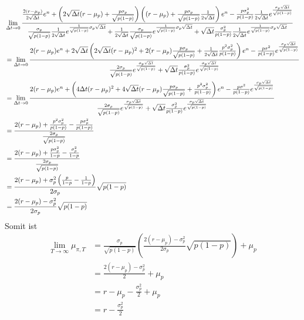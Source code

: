 \documentclass[11pt]{report} %
\begin{document}
\begin{align*}
    &\lim_{\Delta t \to 0}\frac{\frac{2(r-\mu_p)}{2\sqrt{\Delta t}}e^{n}+\left(2\sqrt{\Delta t}(r-\mu_p)+\frac{p\sigma_p}{\sqrt{p(1-p)}}\right)\left((r-\mu_p)+\frac{p\sigma_p}{\sqrt{p(1-p)}}\frac{1}{2\sqrt{\Delta t}}\right)e^{n}\linebreak-\frac{p\sigma_p^2}{p(1-p)}\frac{1}{2\sqrt{\Delta t}}e^{\frac{\sigma_p\sqrt{\Delta t}}{\sqrt{p(1-p)}}}}{\frac{\sigma_p}{\sqrt{p(1-p)}}\frac{1}{2\sqrt{\Delta t}}e^{\frac{1}{\sqrt{p(1-p)}}\sigma_p\sqrt{\Delta t}}+\frac{1}{2\sqrt{\Delta t}}\frac{\sigma_p}{\sqrt{p(1-p)}}e^{\frac{1}{\sqrt{p(1-p)}}\sigma_p\sqrt{\Delta t}}+\sqrt{\Delta t}\frac{\sigma_p^2}{p(1-p)}\frac{1}{2\sqrt{\Delta t}}e^{\frac{1}{\sqrt{p(1-p)}}\sigma_p\sqrt{\Delta t}}}\\
    &=\lim_{\Delta t \to 0}\frac{2(r-\mu_p)e^n+2\sqrt{\Delta t}\left( 2\sqrt{\Delta t}(r-\mu_p)^2+2(r-\mu_p)\frac{p\sigma_p}{\sqrt{p(1-p)}}+\frac{1}{2\sqrt{\Delta t}}\frac{p^2\sigma_p^2}{p(1-p)} \right)e^{n}-\frac{p\sigma^2}{p(1-p)}e^{\frac{\sigma_p\sqrt{\Delta t}}{\sqrt{p(1-p)}}}}{\frac{2\sigma_p}{\sqrt{p(1-p)}}e^{\frac{\sigma_p\sqrt{\Delta t}}{\sqrt{p(1-p)}}}+\sqrt{\Delta t}\frac{\sigma_p^2}{p(1-p)}e^{\frac{\sigma_p\sqrt{\Delta t}}{\sqrt{p(1-p)}}}}\\
    &=\lim_{\Delta t \to 0}\frac{2(r-\mu_p)e^n+\left( 4\Delta t(r-\mu_p)^2+4\sqrt{\Delta t}(r-\mu_p)\frac{p\sigma_p}{\sqrt{p(1-p)}}+\frac{p^2\sigma_p^2}{p(1-p)} \right)e^{n}-\frac{p\sigma^2}{p(1-p)}e^{\frac{\sigma_p\sqrt{\Delta t}}{\sqrt{p(1-p)}}}}{\frac{2\sigma_p}{\sqrt{p(1-p)}}e^{\frac{\sigma_p\sqrt{\Delta t}}{\sqrt{p(1-p)}}}+\sqrt{\Delta t}\frac{\sigma_p^2}{p(1-p)}e^{\frac{\sigma_p\sqrt{\Delta t}}{\sqrt{p(1-p)}}}}\\
    &=\frac{2(r-\mu_p)+\frac{p^2\sigma_p^2}{p(1-p)}-\frac{p\sigma_p^2}{p(1-p)}}{\frac{2\sigma_p}{\sqrt{p(1-p)}}}\\
    &=\frac{2(r-\mu_p)+\frac{p\sigma_p^2}{1-p}-\frac{\sigma_p^2}{1-p}}{\frac{2\sigma_p}{\sqrt{p(1-p)}}}\\
    &=\frac{2(r-\mu_p)+\sigma_p^2\left(\frac{p}{1-p}-\frac{1}{1-p}\right)}{2\sigma_p}\sqrt{p(1-p)}\\
    &=\frac{2(r-\mu_p)-\sigma_p^2}{2\sigma_p}\sqrt{p(1-p)}
\end{align*}
Somit ist
\begin{align*}
    \lim_{T\to\infty}\mu_{\pi, T}&=\frac{\sigma_p}{\sqrt{p(1-p)}}\left(\frac{2(r-\mu_p)-\sigma_p^2}{2\sigma_p}\sqrt{p(1-p)}\right)+\mu_p\\
    &=\frac{2(r-\mu_p)-\sigma_p^2}{2}+\mu_p\\
    &=r-\mu_p-\frac{\sigma_p^2}{2}+\mu_p\\
    &=r-\frac{\sigma_p^2}{2}
\end{align*}
\end{document}
